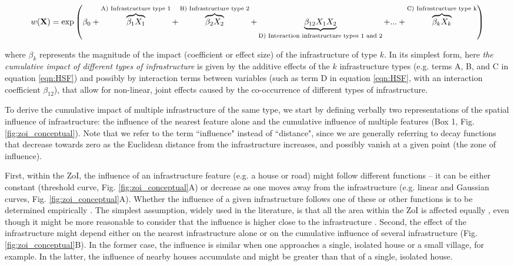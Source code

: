 \documentclass[titlepage]{article}
\begin{document}
\begin{equation}
\centering
\label{eqn:HSF}
    w(\textbf{X}) = \exp \left( \beta_0 + \overbrace{\beta_1 X_1}^\text{A) Infrastructure type 1} + \overbrace{\beta_2 X_2}^\text{B) Infrastructure type 2} + \underbrace{\beta_{12} X_1 X_2}_\text{D) Interaction infrastructure types 1 and 2} + ... + \overbrace{\beta_k X_k}^\text{C) Infrastructure type k} \right)
\end{equation}

where $\beta_k$ represents the magnitude of the impact (coefficient or effect size) of the infrastructure of type $k$. In its simplest form, here \textit{the cumulative impact of different types of infrastructure} is given by the additive effects of the $k$ infrastructure types (e.g. terms A, B, and C in equation \ref{eqn:HSF}) and possibly by interaction terms between variables (such as term D in equation \ref{eqn:HSF}, with an interaction coefficient $\beta_{12}$), that allow for non-linear, joint effects caused by the co-occurrence of different types of infrastructure. 

To derive the cumulative impact of multiple infrastructure of the same type, we start by defining verbally two representations of the spatial influence of infrastructure: the influence of the nearest feature alone and the cumulative influence of multiple features (Box 1, Fig. \ref{fig:zoi_conceptual}). Note that we refer to the term ``influence" instead of ``distance", since we are generally referring to decay functions that decrease towards zero as the Euclidean distance from the infrastructure increases, and possibly vanish at a given point (the zone of influence).

First, within the ZoI, the influence of an infrastructure feature (e.g. a house or road) might follow different functions -- it can be either constant (threshold curve, Fig. \ref{fig:zoi_conceptual}A) or decrease as one moves away from the infrastructure (e.g. linear and Gaussian curves, Fig. \ref{fig:zoi_conceptual}A). 
Whether the influence of a given infrastructure follows one of these or other functions is to be determined empirically \citep{miguet_how_2017}. The simplest assumption, widely used in the literature, is that all the area within the ZoI is affected equally \citep[e.g][]{quinonezpinon_design_2007}, even though it might be more reasonable to consider that the influence is higher close to the infrastructure \citep[][]{skarin_out_2018, zeller_multi-level_2017}. Second, the effect of the infrastructure might depend either on the nearest infrastructure alone or on the cumulative influence of several infrastructure (Fig. \ref{fig:zoi_conceptual}B). In the former case, the influence is similar when one approaches a single, isolated house or a small village, for example. In the latter, the influence of nearby houses accumulate and might be greater than that of a single, isolated house.
\end{document}
